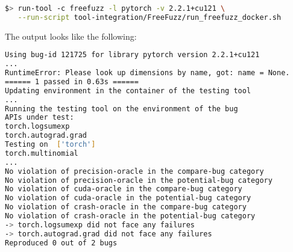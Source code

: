 \documentclass[sigconf,screen]{acmart}
\begin{document}
\begin{lstlisting}[language=bash,basicstyle=\small,keywords={}]
$> run-tool -c freefuzz -l pytorch -v 2.2.1+cu121 \
   --run-script tool-integration/FreeFuzz/run_freefuzz_docker.sh
\end{lstlisting}

The output looks like the following:
\begin{lstlisting}[language=bash,basicstyle=\small,keywords={}]
Using bug-id 121725 for library pytorch version 2.2.1+cu121
...
RuntimeError: Please look up dimensions by name, got: name = None.
====== 1 passed in 0.63s ======
Updating environment in the container of the testing tool
...
Running the testing tool on the environment of the bug
APIs under test:
torch.logsumexp
torch.autograd.grad
Testing on  ['torch']
torch.multinomial
...
No violation of precision-oracle in the compare-bug category
No violation of precision-oracle in the potential-bug category
No violation of cuda-oracle in the compare-bug category
No violation of cuda-oracle in the potential-bug category
No violation of crash-oracle in the compare-bug category
No violation of crash-oracle in the potential-bug category
-> torch.logsumexp did not face any failures
-> torch.autograd.grad did not face any failures
Reproduced 0 out of 2 bugs
\end{lstlisting}


\end{document}
